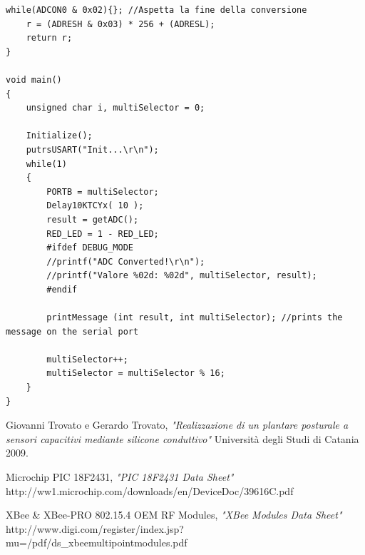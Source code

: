 \documentclass[12pt,a4paper,oneside,openright,italian]{article}
\begin{document}
\begin{lstlisting}[caption={Firmware}, label={code:pic},frame=trBL]
	while(ADCON0 & 0x02){}; //Aspetta la fine della conversione
	r = (ADRESH & 0x03) * 256 + (ADRESL);
	return r;
}

void main()
{
	unsigned char i, multiSelector = 0;
	
	Initialize();
	putrsUSART("Init...\r\n");
	while(1)
	{
		PORTB = multiSelector;
		Delay10KTCYx( 10 );
		result = getADC();
		RED_LED = 1 - RED_LED;
 		#ifdef DEBUG_MODE
 		//printf("ADC Converted!\r\n");
  		//printf("Valore %02d: %02d", multiSelector, result);
		#endif

		printMessage (int result, int multiSelector); //prints the message on the serial port
		
		multiSelector++;
		multiSelector = multiSelector % 16;
	}	
}
\end{lstlisting}

\newpage
\begin{thebibliography}{9}

 Giovanni Trovato e Gerardo Trovato, \emph{"Realizzazione di un plantare posturale a sensori capacitivi mediante silicone conduttivo"} \newline Universit\`a degli Studi di Catania 2009.

 Microchip PIC 18F2431, \emph{"PIC 18F2431 Data Sheet"} \newline http://ww1.microchip.com/downloads/en/DeviceDoc/39616C.pdf

 XBee \& XBee-PRO 802.15.4 OEM RF Modules, \emph{"XBee Modules Data Sheet"} \newline http://www.digi.com/register/index.jsp?mu=/pdf/ds\_xbeemultipointmodules.pdf

  
\end{thebibliography}
\end{document}
